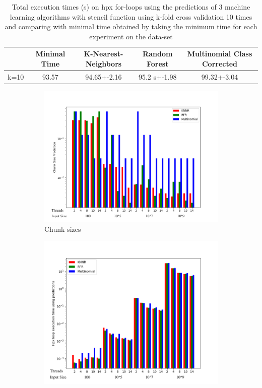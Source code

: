 \begin{table}[h]
	\centering
	\caption{Total execution times (s) on hpx for-loops using the predictions of 3 machine learning algorithms with stencil function using k-fold cross validation 10 times and comparing with minimal time obtained by taking the minimum time for each experiment on the data-set}
	\label{my-label}
	\begin{tabular}{|c|c|c|c|c|}
		\hline
		& Minimal Time &K-Nearest-Neighbors & Random Forest &Multinomial Class Corrected\\ \hline
		k=10 & 93.57&94.65+-2.16  & 95.2 s+-1.98 & 99.32+-3.04\\ \hline
	\end{tabular}
\end{table}
\begin{figure}[h]
	\centering
	\begin{subfigure}[b]{0.5\textwidth}
		\centering
		\includegraphics[width=\textwidth]{images/stencil_predictions_bars.png}
		\caption[Network2]%
		{{Chunk sizes}}    
	\end{subfigure}
	\hfill
	\begin{subfigure}[b]{0.49\textwidth}  
		\centering 
		\includegraphics[width=\textwidth]{images/stencil_times_bars.png}

\end{subfigure}
\end{figure}
